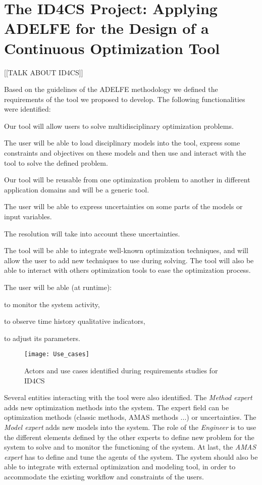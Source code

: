 \section{The ID4CS Project: Applying ADELFE for the Design of a Continuous Optimization Tool}

[[TALK ABOUT ID4CS]]

Based on the guidelines of the ADELFE methodology we defined the requirements of the tool we proposed to develop. The following functionalities were identified:
\begin{compactitem}
\item Our tool will allow users to solve multidisciplinary optimization problems.
\item  The user will be able to load disciplinary models into the tool, express some constraints and objectives on these models and then use and interact with the tool to solve the defined problem.
\item Our tool will be reusable from one optimization problem to another in different application domains and will be a generic tool.
\item The user will be able to express uncertainties on some parts of the models or input variables.
\item The resolution will take into account these uncertainties.
\item The tool will be able to integrate well-known optimization techniques, and will allow the user to add new techniques to use during solving. The tool will also be able to interact with others optimization tools to ease the optimization process.

\item The user will be able (at runtime):
	\begin{compactitem}
    \item to monitor the system activity,
    \item to observe time history qualitative indicators,
    \item to adjust its parameters.
    \end{compactitem}
\end{compactitem}

\begin{figure}
\centering
\texttt{[image: Use\_cases]}
\caption{Actors and use cases identified during requirements studies for ID4CS}\label{Use_cases}
\end{figure}

Several entities interacting with the tool were also identified. The \emph{Method expert} adds new optimization methods into the system. The expert field can be optimization methods (classic methods, AMAS methods ...) or uncertainties. The \emph{Model expert} adds new models into the system. The role of the \emph{Engineer} is to use the different elements defined by the other experts to define new problem for the system to solve and to monitor the functioning of the system. At last, the \emph{AMAS expert} has to define and tune the agents of the system. The system should also be able to integrate with external optimization and modeling tool, in order to accommodate the existing workflow and constraints of the users.

